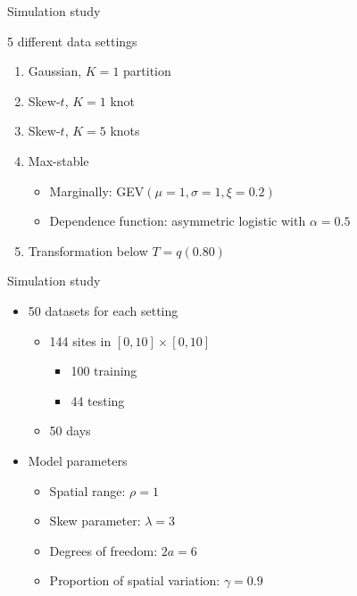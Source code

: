 \documentclass{beamer}
\begin{document}
\begin{frame}{Simulation study}
\begin{adjustwidth}{1em}{0em}
  5 different data settings \vspace{0.5em}
  \begin{enumerate}[1.] \setlength{\itemsep}{0.5em}
    \item Gaussian, $K = 1$ partition
    \item Skew-$t$, $K = 1$ knot
    \item Skew-$t$, $K = 5$ knots
    \item Max-stable \vspace{0.25em}
    \begin{itemize} \setlength{\itemsep}{0.25em}
      \item Marginally: GEV$(\mu=1, \sigma=1, \xi=0.2)$
      \item Dependence function: asymmetric logistic with $\alpha = 0.5$
    \end{itemize}
    \item Transformation below $T = q(0.80)$
  \end{enumerate}
\end{adjustwidth}
\end{frame}

\begin{frame}{Simulation study}
  \begin{itemize} \setlength{\itemsep}{1em}
    \item 50 datasets for each setting \vspace{0.5em}
    \begin{itemize} \setlength{\itemsep}{0.5em}
      \item 144 sites in $[0, 10] \times [0, 10]$ \vspace{0.25em}
      \begin{itemize} \setlength{\itemsep}{0.25em}
        \item 100 training
        \item 44 testing
      \end{itemize}
      \item 50 days
    \end{itemize}
    \item Model parameters \vspace{0.5em}
    \begin{itemize} \setlength{\itemsep}{0.5em}
      \item Spatial range: $\rho = 1$
      \item Skew parameter: $\lambda = 3$
      \item Degrees of freedom: $2a = 6$
      \item Proportion of spatial variation: $\gamma = 0.9$
    \end{itemize}
  \end{itemize}
\end{frame}
\end{document}
